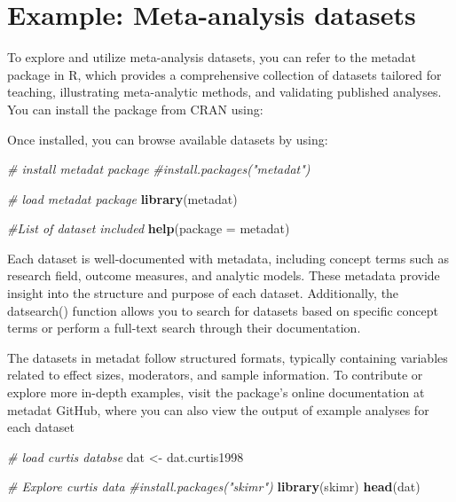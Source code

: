 \documentclass[
]{book}
\newenvironment{Shaded}{\begin{snugshade}}{\end{snugshade}}
\newcommand{\AttributeTok}[1]{\textcolor[rgb]{0.13,0.29,0.53}{#1}}
\newcommand{\CommentTok}[1]{\textcolor[rgb]{0.56,0.35,0.01}{\textit{#1}}}
\newcommand{\FunctionTok}[1]{\textcolor[rgb]{0.13,0.29,0.53}{\textbf{#1}}}
\newcommand{\NormalTok}[1]{#1}
\newcommand{\OtherTok}[1]{\textcolor[rgb]{0.56,0.35,0.01}{#1}}
\begin{document}
\section{Example: Meta-analysis datasets}\label{example-meta-analysis-datasets}

To explore and utilize meta-analysis datasets, you can refer to the metadat package in R, which provides a comprehensive collection of datasets tailored for teaching, illustrating meta-analytic methods, and validating published analyses.
You can install the package from CRAN using:

Once installed, you can browse available datasets by using:

\begin{Shaded}
\begin{Highlighting}[]
\CommentTok{\# install metadat package}
\CommentTok{\#install.packages("metadat")}

\CommentTok{\# load metadat package}
\FunctionTok{library}\NormalTok{(metadat)}

\CommentTok{\#List of dataset included}
\FunctionTok{help}\NormalTok{(}\AttributeTok{package =}\NormalTok{ metadat)}
\end{Highlighting}
\end{Shaded}

Each dataset is well-documented with metadata, including concept terms such as research field, outcome measures, and analytic models.
These metadata provide insight into the structure and purpose of each dataset.
Additionally, the datsearch() function allows you to search for datasets based on specific concept terms or perform a full-text search through their documentation.

The datasets in metadat follow structured formats, typically containing variables related to effect sizes, moderators, and sample information.
To contribute or explore more in-depth examples, visit the package's online documentation at metadat GitHub, where you can also view the output of example analyses for each dataset

\begin{Shaded}
\begin{Highlighting}[]
\CommentTok{\# load curtis databse}
\NormalTok{dat }\OtherTok{\textless{}{-}}\NormalTok{ dat.curtis1998}

\CommentTok{\# Explore curtis data}
\CommentTok{\#install.packages("skimr")}
\FunctionTok{library}\NormalTok{(skimr)}
\FunctionTok{head}\NormalTok{(dat)}
\end{Highlighting}
\end{Shaded}
\end{document}
